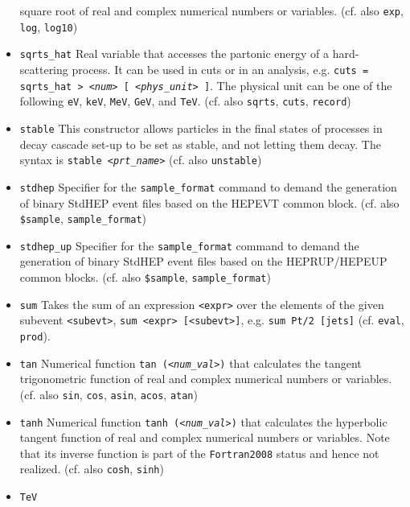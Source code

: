 \documentclass[12pt]{book}
\newcommand{\ttt}[1]{\texttt{#1}}
\begin{document}
\begin{itemize}
square root of real and complex numerical numbers or
variables. (cf. also \ttt{exp}, \ttt{log}, \ttt{log10})
\item
\ttt{sqrts\_hat} \newline
Real variable that accesses the partonic energy of a hard-scattering
process. It can be used in cuts or in an analysis, e.g. \ttt{cuts =
sqrts\_hat > {\em <num>} [ {\em <phys\_unit>} ]}. The physical unit
can be one of the following \ttt{eV}, \ttt{keV}, \ttt{MeV}, \ttt{GeV},
and \ttt{TeV}. (cf. also \ttt{sqrts}, \ttt{cuts}, \ttt{record})
\item
\ttt{stable} \newline
This constructor allows particles in the final states of processes in
decay cascade set-up to be set as stable, and not letting them
decay. The syntax is \ttt{stable {\em <prt\_name>}} (cf. also \ttt{unstable})
\item
\ttt{stdhep} \newline
Specifier for the \ttt{sample\_format} command to demand the
generation of binary StdHEP event files based on the HEPEVT common
block. (cf. also \ttt{\$sample}, \ttt{sample\_format})
\item
\ttt{stdhep\_up} \newline
Specifier for the \ttt{sample\_format} command to demand the
generation of binary StdHEP event files based on the HEPRUP/HEPEUP common
blocks. (cf. also \ttt{\$sample}, \ttt{sample\_format})
\item
\ttt{sum} \newline
Takes the sum of an expression \ttt{<expr>} over the elements of
the given subevent \ttt{<subevt>}, \ttt{sum <expr> [<subevt>]}, e.g.
\ttt{sum Pt/2 [jets]} (cf. \ttt{eval}, \ttt{prod}).
\item
\ttt{tan} \newline
Numerical function \ttt{tan ({\em <num\_val>})} that calculates the
tangent trigonometric function of real and complex numerical numbers or
variables. (cf. also \ttt{sin}, \ttt{cos}, \ttt{asin}, \ttt{acos},
\ttt{atan})
\item
\ttt{tanh} \newline
Numerical function \ttt{tanh ({\em <num\_val>})} that calculates the
hyperbolic tangent function of real and complex numerical numbers or
variables. Note that its inverse function is part of the
\ttt{Fortran2008} status and hence not realized. (cf. also \ttt{cosh},
\ttt{sinh})
\item
\ttt{TeV} \newline

\end{itemize}
\end{document}
